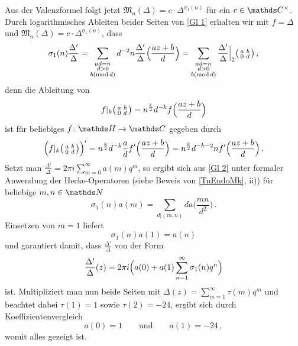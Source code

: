 \begin{bewe}
Aus der Valenzformel folgt jetzt $\mathfrak{M}_n(\Delta) = c \cdot \Delta^{\sigma_1(n)}$ für ein $c \in \CC^\times$. Durch logarithmisches Ableiten beider Seiten von \autoref{Gl 1} erhalten wir mit $f  = \Delta$ und $\mathfrak{M}_n(\Delta) = c \cdot \Delta^{\sigma_1(n)}$, dass
\begin{equation}
\label{Gl 2}
\sigma_1(n) \frac {\Delta'}{\Delta} = \sum_{\substack{ad = n\\ d > 0\\ b (\operatorname{mod} d)}} d^{-2}n \frac{\Delta'}{\Delta} \Bigl( \frac{az+b}{d} \Bigr) = \sum_{\substack{ad = n\\ d > 0\\ b (\operatorname{mod} d)}} \frac{\Delta'}{\Delta} \Big|_2 \mymat{a}{b}{0}{d}
\,,
\end{equation}
denn die Ableitung von
\[
f |_k \mymat{a}{b}{0}{d} = n^{\frac k2} d^{-k} f\Bigl( \frac{az+b}{d} \Bigr)
\]
ist für beliebiges $f \colon \HH \to \CC$ gegeben durch
\[
\Bigl(f |_k \mymat{a}{b}{0}{d}\Bigr)' = n^{\frac k2} d^{-k} \frac ad f' \Bigl( \frac{az+b}{d} \Bigr) = n^{\frac k2} d^{-k-2} n f'\Bigl( \frac{az+b}{d} \Bigr)
\,.
\]
Setzt man $\frac{\Delta'}{\Delta} = 2\pi i \sum_{m=0}^\infty a(m) q^m$, so ergibt sich aus \autoref{Gl 2} unter formaler Anwendung der Hecke-Operatoren (siehe Beweis von \autoref{TnEndoMk}, ii)) für beliebige $m,n \in \NN$
\[
\sigma_1(n) a(m) = \sum_{d\vert(m,n)} d a\bigl( \frac{mn}{d^2} \bigr)
\,.
\]
Einsetzen von $m = 1$ liefert
\[
\sigma_1(n) a(1) = a(n)
\]
und garantiert damit, dass $\frac{\Delta'}{\Delta}$ von der Form
\[
\frac{\Delta'}{\Delta}(z) = 2\pi i \Bigl( a(0) + a(1) \sum_{n=1}^\infty \sigma_1(n) q^n \Bigr)
\]
ist. Multipliziert man nun beide Seiten mit $\Delta(z) = \sum_{m=1}^\infty \tau(m) q^m$ und beachtet dabei $\tau(1) = 1$ sowie $\tau(2) = -24$, ergibt sich durch Koeffizientenvergleich
\[
a(0) = 1 \qquad \text{und} \qquad a(1) = -24
\,,
\]
womit alles gezeigt ist.
\end{bewe}




